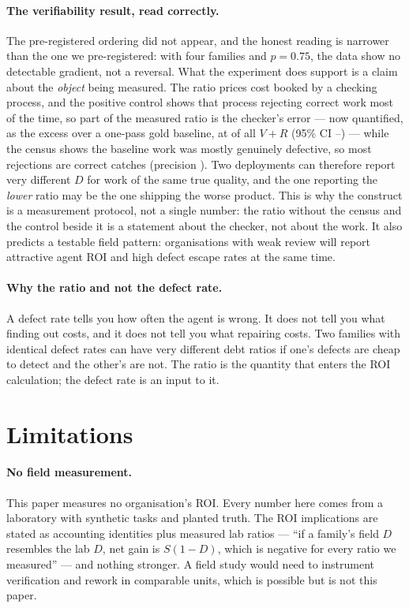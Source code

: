 \documentclass[11pt]{article}
\newcommand{\D}{\ensuremath{D}}
\newcommand{\SV}{\ensuremath{S}}
\newcommand{\VV}{\ensuremath{V}}
\newcommand{\RV}{\ensuremath{R}}
\begin{document}
\paragraph{The verifiability result, read correctly.} The pre-registered ordering did not appear,
and the honest reading is narrower than the one we pre-registered: with four families and
$p=0.75$, the data show no detectable gradient, not a reversal. What the experiment does support is
a claim about the \emph{object} being measured. The ratio prices cost booked by a checking process,
and the positive control shows that process rejecting correct work most of the time, so part of
the measured ratio is the checker's error --- now quantified, as the excess over a one-pass gold
baseline, at \VDchkShare{} of all $\VV+\RV$ (95\% CI \VDchkShareLo--\VDchkShareHi) --- while the
census shows the baseline
work was mostly genuinely defective, so most rejections are correct catches (precision \VDdetPrec{}).
Two deployments can therefore report very
different $\D$ for work of the same true quality, and the one reporting the \emph{lower} ratio may
be the one shipping the worse product. This is why the construct is a measurement protocol, not a
single number: the ratio without the census and the control beside it is a statement about the
checker, not about the work. It also predicts a testable field pattern: organisations with weak
review will report attractive agent ROI and high defect escape rates at the same time.

\paragraph{Why the ratio and not the defect rate.} A defect rate tells you how often the agent is
wrong. It does not tell you what finding out costs, and it does not tell you what repairing costs.
Two families with identical defect rates can have very different debt ratios if one's defects are
cheap to detect and the other's are not. The ratio is the quantity that enters the ROI
calculation; the defect rate is an input to it.

\section{Limitations}
\label{sec:limitations}

\paragraph{No field measurement.} This paper measures no organisation's ROI. Every number here
comes from a laboratory with synthetic tasks and planted truth. The ROI implications are stated as
accounting identities plus measured lab ratios --- ``if a family's field $\D$ resembles the lab
$\D$, net gain is $\SV(1-\D)$, which is negative for every ratio we measured'' --- and nothing
stronger. A field study would need to instrument verification and rework in comparable units,
which is possible but is not this paper.
\end{document}
